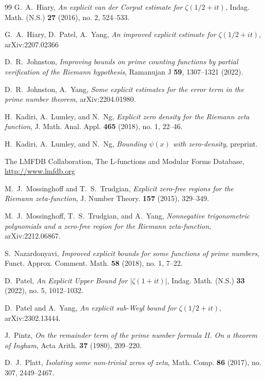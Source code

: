 \documentclass[10pt]{amsart}
\theoremstyle{definition}
\numberwithin{equation}{section}
\begin{document}
\begin{thebibliography}{99}
G.~A.~Hiary, 
{\it An explicit van der Corput estimate for $\zeta(1/2 + it)$},
 Indag. Math. (N.S.) {\bf 27} (2016), no. 2, 524--533. 
 
 G.~A.~Hiary, D.~Patel,  A.~Yang, 
 {\it An improved explicit estimate for $\zeta(1/2+it)$},
 arXiv:2207.02366
 
 D.~R.~Johnston,
{\it  Improving bounds on prime counting functions by partial verification of the Riemann hypothesis},
Ramanujan J {\bf 59}, 1307--1321 (2022). 

D.~R.~Johnston, A.~Yang, 
{\it Some explicit estimates for the error term in the prime number theorem},
arXiv:2204.01980.
 
H.~Kadiri, A.~Lumley, and N.~Ng, 
{\it Explicit zero density for the Riemann zeta function}, 
J. Math. Anal. Appl. {\bf 465} (2018), no. 1, 22--46.

H.~Kadiri, A.~Lumley, and N.~Ng, 
{\it Bounding $\psi(x)$ with zero-density}, 
preprint. 

{The {LMFDB Collaboration}},  {The {L}-functions and Modular Forms Database}, \url{http://www.lmfdb.org}

M.~J.~Mossinghoff and T.~S.~Trudgian,
{\it  Explicit zero-free regions for the Riemann zeta-function},
J. Number Theory. {\bf 157} (2015), 329--349.

M.~J.~Mossinghoff, T.~S.~Trudgian, and A.~Yang,
{\it  Nonnegative trigonometric polynomials and a zero-free region for the Riemann zeta-function}, arXiv:2212.06867.

S.~Nazardonyavi,
{\it Improved explicit bounds for some functions of prime numbers}, 
Funct. Approx. Comment. Math. {\bf 58} (2018), no. 1, 7--22. 

D.~Patel, 
{\it An Explicit Upper Bound for $|\zeta(1 + it)|$}, 
 Indag. Math. (N.S.) {\bf 33} (2022), no. 5, 1012--1032. 

D.~Patel and A.~Yang,
{\it An explicit sub-Weyl bound for $\zeta(1/2+it)$}, 
arXiv:2302.13444.

J.~Pintz, 
{\it On the remainder term of the prime number formula II. On a theorem of Ingham}, 
Acta Arith. {\bf 37} (1980), 209--220.

 D.~J.~Platt, 
 {\it Isolating some non-trivial zeros of zeta}, Math. Comp. {\bf 86} (2017), no. 307, 2449--2467.


\end{thebibliography}
\end{document}
